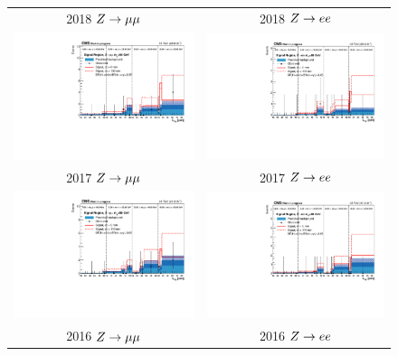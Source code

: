 \begin{figure}[htb!]
	\centering
	\begin{tabular}{c c}
		2018 $\VZ\to\mu\mu$ & 2018 $\VZ\to ee$\\
		\includegraphics[width=0.45\linewidth]{figs/05_analysis/closure_ZH_MU_m55_data_2018.pdf} &
		\includegraphics[width=0.45\linewidth]{figs/05_analysis/closure_ZH_ELE_m55_data_2018.pdf} \\
		2017 $\VZ\to\mu\mu$ & 2017 $\VZ\to ee$\\
		\includegraphics[width=0.45\linewidth]{figs/05_analysis/closure_ZH_MU_m55_data_2017.pdf} &
		\includegraphics[width=0.45\linewidth]{figs/05_analysis/closure_ZH_ELE_m55_data_2017.pdf} \\
		2016 $\VZ\to\mu\mu$ & 2016 $\VZ\to ee$\\

\end{tabular}
\end{figure}
